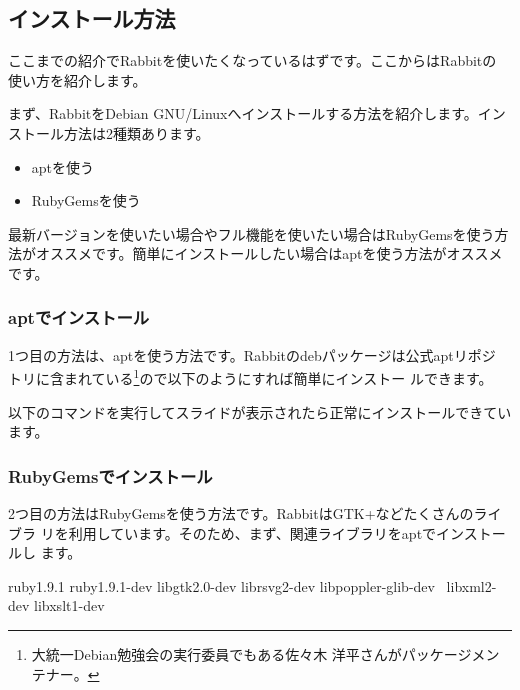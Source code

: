 \documentclass[mingoth,a4paper]{jsarticle}
\begin{document}
\subsection{インストール方法}

ここまでの紹介でRabbitを使いたくなっているはずです。ここからはRabbitの
使い方を紹介します。

まず、RabbitをDebian GNU/Linuxへインストールする方法を紹介します。イン
ストール方法は2種類あります。

\begin{itemize}
\item aptを使う
\item RubyGemsを使う
\end{itemize}

最新バージョンを使いたい場合やフル機能を使いたい場合はRubyGemsを使う方
法がオススメです。簡単にインストールしたい場合はaptを使う方法がオススメ
です。

\subsubsection{aptでインストール}

1つ目の方法は、aptを使う方法です。Rabbitのdebパッケージは公式aptリポジ
トリに含まれている\footnote{大統一Debian勉強会の実行委員でもある佐々木
  洋平さんがパッケージメンテナー。}ので以下のようにすれば簡単にインストー
ルできます。

\begin{commandline}
\end{commandline}

以下のコマンドを実行してスライドが表示されたら正常にインストールできています。

\begin{commandline}
\end{commandline}

\subsubsection{RubyGemsでインストール}

2つ目の方法はRubyGemsを使う方法です。RabbitはGTK+などたくさんのライブラ
リを利用しています。そのため、まず、関連ライブラリをaptでインストールし
ます。

\begin{commandline}
    ruby1.9.1 ruby1.9.1-dev libgtk2.0-dev librsvg2-dev libpoppler-glib-dev \
    libxml2-dev libxslt1-dev
\end{commandline}
\end{document}
